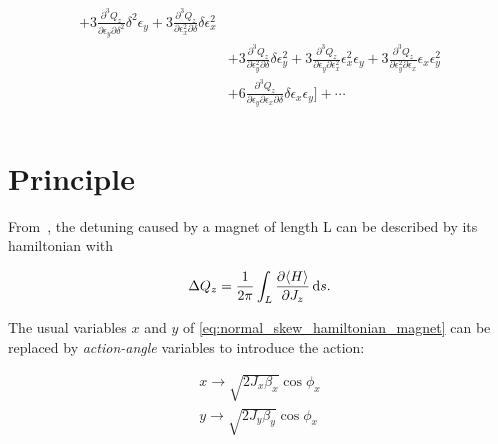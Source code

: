 \begin{equation}
\begin{aligned}
\begin{aligned}
                                                + 3  \frac{\partial^{3} Q_z}{\partial \epsilon_{y}\partial \delta^{2}}  \delta^{2} \epsilon_{y}
                                                + 3 \frac{\partial^{3} Q_z}{\partial \epsilon_{x}^{2}\partial \delta}  \delta \epsilon_{x}^{2} \\
                                               &+ 3 \frac{\partial^{3} Q_z}{\partial \epsilon_{y}^{2}\partial \delta} \delta \epsilon_{y}^{2}  
                                                + 3  \frac{\partial^{3} Q_z}{\partial \epsilon_{y}\partial \epsilon_{x}^{2}} \epsilon_{x}^{2} \epsilon_{y} 
                                                + 3 \frac{\partial^{3} Q_z}{\partial \epsilon_{y}^{2}\partial \epsilon_{x}} \epsilon_{x} \epsilon_{y}^{2} \\
                                               &+ 6 \frac{\partial^{3} Q_z}{\partial \epsilon_{y}\partial  \epsilon_{x}\partial \delta} \delta \epsilon_{x} \epsilon_{y} 
                                             \biggr] + \cdots \\
                                             \end{aligned}
\end{aligned}
\end{equation}


\section{Principle}

From~\cite{dilly_derivation_2023}, the detuning caused by a magnet of length L can be described by
its hamiltonian with 

\begin{equation}
  \Delta Q_z = \frac{1}{2 \pi} \int_L \frac{\partial \langle H \rangle}{\partial J_z} \mathop{}\!\mathrm{d} s.
\end{equation}

The usual variables $x$ and $y$ of \cref{eq:normal_skew_hamiltonian_magnet} can be replaced by
\textit{action-angle} variables to introduce the action:

\begin{equation}
  \begin{aligned}
    x \rightarrow \sqrt{2J_x \beta_x} \cos{\phi_x} \\
    y \rightarrow \sqrt{2J_y \beta_y} \cos{\phi_x}
  \end{aligned}
  \label{appendix:chromatic_ampdet:action_angle}
\end{equation}

